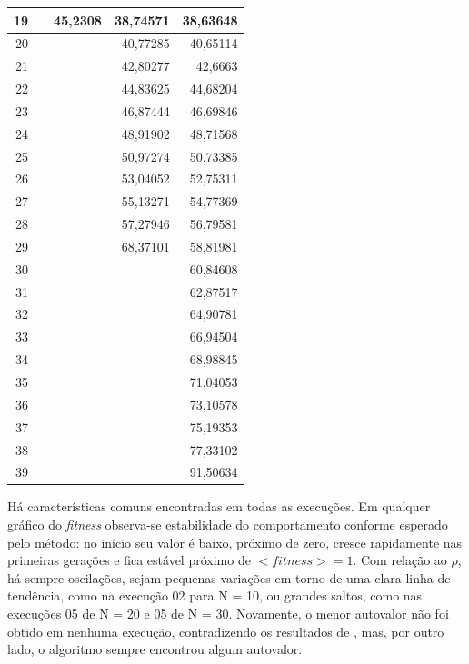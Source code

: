 \begin{table}[htb]
\begin{center}
\begin{tabular}{r|r|r|r|r}
	\hline
					19 &            &    45,2308 &   38,74571 &   38,63648 \\
	\hline
					20 &            &            &   40,77285 &   40,65114 \\
	\hline
					21 &            &            &   42,80277 &    42,6663 \\
	\hline
					22 &            &            &   44,83625 &   44,68204 \\
	\hline
					23 &            &            &   46,87444 &   46,69846 \\
	\hline
					24 &            &            &   48,91902 &   48,71568 \\
	\hline
					25 &            &            &   50,97274 &   50,73385 \\
	\hline
					26 &            &            &   53,04052 &   52,75311 \\
	\hline
					27 &            &            &   55,13271 &   54,77369 \\
	\hline
					28 &            &            &   57,27946 &   56,79581 \\
	\hline
					29 &            &            &   68,37101 &   58,81981 \\
	\hline
					30 &            &            &            &   60,84608 \\
	\hline
					31 &            &            &            &   62,87517 \\
	\hline
					32 &            &            &            &   64,90781 \\
	\hline
					33 &            &            &            &   66,94504 \\
	\hline
					34 &            &            &            &   68,98845 \\
	\hline
					35 &            &            &            &   71,04053 \\
	\hline
					36 &            &            &            &   73,10578 \\
	\hline
					37 &            &            &            &   75,19353 \\
	\hline
					38 &            &            &            &   77,33102 \\
	\hline
					39 &            &            &            &   91,50634 \\
	\hline \hline
	\end{tabular}
	\end{center}  
\end{table}
	
	Há características comuns encontradas em todas as execuções. Em qualquer gráfico do \textit{fitness} observa-se estabilidade do comportamento conforme esperado pelo método: no início seu valor é baixo, próximo de zero, cresce rapidamente nas primeiras gerações e fica estável próximo de $<fitness> = 1$. Com relação ao $\rho$, há sempre oscilações, sejam pequenas variações em torno de uma clara linha de tendência, como na execução 02 para N = 10, ou grandes saltos, como nas execuções 05 de N = 20 e 05 de N = 30. Novamente, o menor autovalor não foi obtido em nenhuma execução, contradizendo os resultados de \cite{metodo2004}, mas, por outro lado, o algoritmo sempre encontrou algum autovalor.
	
